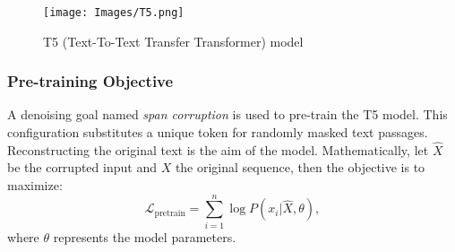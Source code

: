 \documentclass{dhbenelux}
\begin{document}
\begin{figure}[h]
\caption{ T5 (Text-To-Text Transfer Transformer) model}
\centering
\texttt{[image: Images/T5.png]}
\label{fig:t5-model}
\end{figure}

\subsubsection{Pre-training Objective}
A denoising goal named \textit{span corruption} is used to pre-train the T5 model. This configuration substitutes a unique token for randomly masked text passages. Reconstructing the original text is the aim of the model.  Mathematically, let $\hat{X}$ be the corrupted input and $X$ the original sequence, then the objective is to maximize:
\begin{equation}
\mathcal{L}_{\text{pretrain}} = \sum_{i=1}^n \log P(x_i | \hat{X}, \theta),
\label{eq:pretrain-objective}
\end{equation}
where $\theta$ represents the model parameters.
\end{document}
